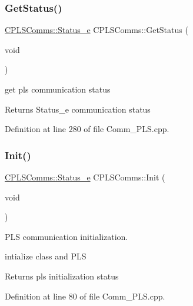 \subsubsection{\texorpdfstring{Get\+Status()}{GetStatus()}}
{\footnotesize\ttfamily \mbox{\hyperlink{class_c_p_l_s_comms_a765bc36363f75f4faf4fd2b41d440159}{C\+P\+L\+S\+Comms\+::\+Status\+\_\+e}} C\+P\+L\+S\+Comms\+::\+Get\+Status (\begin{DoxyParamCaption}\item[{void}]{ }\end{DoxyParamCaption})}



get pls communication status 

\begin{DoxyReturn}{Returns}
Status\+\_\+e communication status 
\end{DoxyReturn}


Definition at line 280 of file Comm\+\_\+\+P\+L\+S.\+cpp.

\mbox{\label{class_c_p_l_s_comms_ae7f8d87ea15de35a120d65a7a8bbbb76}} 
\subsubsection{\texorpdfstring{Init()}{Init()}}
{\footnotesize\ttfamily \mbox{\hyperlink{class_c_p_l_s_comms_a765bc36363f75f4faf4fd2b41d440159}{C\+P\+L\+S\+Comms\+::\+Status\+\_\+e}} C\+P\+L\+S\+Comms\+::\+Init (\begin{DoxyParamCaption}\item[{void}]{ }\end{DoxyParamCaption})}



P\+LS communication initialization. 

intialize class and P\+LS \begin{DoxyReturn}{Returns}
pls initialization status 
\end{DoxyReturn}


Definition at line 80 of file Comm\+\_\+\+P\+L\+S.\+cpp.

